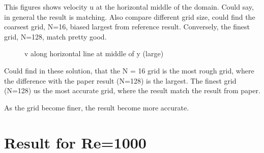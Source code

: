 \documentclass[12pt]{article}
\begin{document}
This figures shows velocity u at the horizontal middle of the domain. Could say, in general the result is matching. Also compare different grid size, could find the coarsest grid, N=16, biased largest from reference result. Conversely, the finest grid, N=128, match pretty good.


\begin{figure}[H]
    \centering
    \caption{v along horizontal line at middle of y (large)}
\end{figure}


Could find in these solution, that the N = 16 grid is the most rough grid, where the difference with the paper result (N=128) is the largest.
The finest grid (N=128) us the most accurate grid, where the result match the result from paper.  

As the grid become finer, the result become more accurate.























\section{Result for Re=1000}
\end{document}
